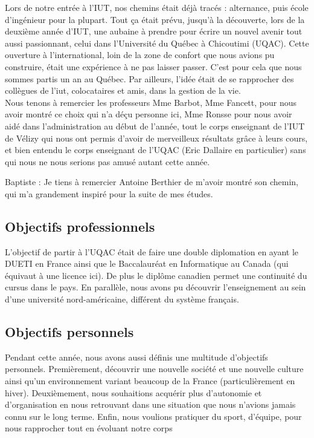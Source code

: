 Lors de notre entrée à l'IUT, nos chemins était déjà tracés : alternance, puis école d'ingénieur pour la plupart. Tout ça était prévu, jusqu'à la découverte, lors de la deuxième année d'IUT, une aubaine à prendre pour écrire un nouvel avenir tout aussi passionnant, celui dans l'Université du Québec à Chicoutimi (UQAC). Cette ouverture à l'international, loin de la zone de confort que nous avions pu construire, était une expérience à ne pas laisser passer. C'est pour cela que nous sommes partis un an au Québec.
Par ailleurs, l'idée était de se rapprocher des collègues de l'iut, colocataires et amis, dans la gestion de la vie.\\

Nous tenons à remercier les professeurs Mme Barbot, Mme Fancett, pour nous avoir montré ce choix qui n'a déçu personne ici, Mme Ronsse pour nous avoir aidé dans l'administration au début de l'année, tout le corps enseignant de l'IUT de Vélizy qui nous ont permis d'avoir de merveilleux résultats grâce à leurs cours, et bien entendu le corps enseignant de l'UQAC (Eric Dallaire en particulier) sans qui nous ne nous serions pas amusé autant cette année.

Baptiste : Je tiens à remercier Antoine Berthier de m'avoir montré son chemin, qui m'a grandement inspiré pour la suite de mes études. 

\subsection{Objectifs professionnels}

L'objectif de partir à l'UQAC était de faire une double diplomation en ayant le DUETI en France ainsi que le Baccalauréat en Informatique au Canada (qui équivaut à une licence ici). De plus le diplôme canadien permet une continuité du cursus dans le pays. En parallèle, nous avons pu découvrir l'enseignement au sein d'une université nord-américaine, différent du système français.

\subsection{Objectifs personnels}

Pendant cette année, nous avons aussi définis une multitude d'objectifs personnels.
Premièrement, découvrir une nouvelle société et une nouvelle culture ainsi qu'un environnement variant beaucoup de la France (particulièrement en hiver). 
Deuxièmement, nous souhaitions acquérir plus d'autonomie et d'organisation en nous retrouvant dans une situation que nous n'avions jamais connu sur le long terme.
Enfin, nous voulions pratiquer du sport, d'équipe, pour nous rapprocher tout en évoluant notre corps

